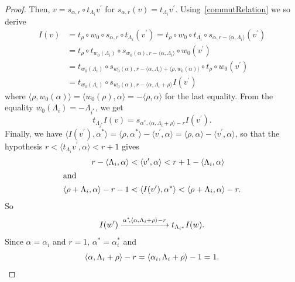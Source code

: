 \documentclass[ALCO,ThmDefs,Unicode,epreuves]{cedram}
\begin{document}
\begin{proof}
Then, $v=s_{\alpha,r}\circ t_{\Lambda_{i}}v^{\prime}$ for $s_{\alpha
,r}(v)=t_{\Lambda_{i}}v^{\prime}$. Using~\eqref{commutRelation} we so derive%
\begin{align*}
I(v)&=t_{\rho}\circ w_{0}\circ s_{\alpha,r}\circ t_{\Lambda_{i}}(v^{\prime
})=t_{\rho}\circ w_{0}\circ t_{\Lambda_{i}}\circ s_{\alpha,r-\langle
\alpha,\Lambda_{i}\rangle}(v^{\prime})\\
&=t_{\rho}\circ t_{w_{0}(\Lambda_{i})}\circ s_{w_{0}(\alpha),r-\langle
\alpha,\Lambda_{i}\rangle}\circ w_{0}(v^{\prime})\\
&=t_{w_{0}(\Lambda_{i})}\circ
s_{w_{0}(\alpha),r-\langle\alpha,\Lambda_{i}\rangle+\langle\rho,w_{0}%
(\alpha)\rangle}\circ t_{\rho}\circ w_{0}(v^{\prime})\\
&=t_{w_{0}(\Lambda_{i})}\circ s_{w_{0}(\alpha),r-\langle\alpha,\Lambda_{i}%
+\rho\rangle}I(v^{\prime})
\end{align*}
where $\langle\rho,w_{0}(\alpha)\rangle=\langle w_{0}(\rho),\alpha
\rangle=-\langle\rho,\alpha\rangle$ for the last equality. From the equality
$w_{0}(\Lambda_{i})=-\Lambda_{i^{\ast}}$, we get
\[
t_{\Lambda_{i^{\ast}}}I(v)=s_{\alpha^{\ast},\langle\alpha,\Lambda_{i}%
+\rho\rangle-r}I(v^{\prime}).
\]
Finally, we have $\langle I(v^{\prime}),\alpha^{\ast}\rangle=\langle
\rho,\alpha^{\ast}\rangle-\langle v^{\prime},\alpha\rangle=\langle\rho
,\alpha\rangle-\langle v^{\prime},\alpha\rangle$, so that the hypothesis
$r<\langle t_{\Lambda_{i}}v^{\prime},\alpha\rangle<r+1$ gives
\begin{align*}
r-\langle\Lambda_{i},\alpha\rangle & <\langle v^{\prime},\alpha
\rangle<r+1-\langle\Lambda_{i},\alpha\rangle \\
\intertext{and}%
\langle\rho+\Lambda_{i},\alpha\rangle-r-1 & <\langle I(v^{\prime}%
),\alpha^{\ast}\rangle<\langle\rho+\Lambda_{i},\alpha\rangle-r.
\end{align*}
So
\[
I(w^{\prime}%
)\xrightarrow{\alpha^{*}\mkern-4mu ,\langle \alpha,\Lambda_{i}+\rho\rangle-r}t_{\Lambda
_{i^{\ast}}}I(w).
\]
Since $\alpha=\alpha_{i}$ and $r=1$, $\alpha^{\ast}=\alpha_{i}^{\ast}$ and
\[
\langle\alpha,\Lambda_{i}+\rho\rangle-r=\langle\alpha_{i},\Lambda_{i}%
+\rho\rangle-1=1.\qedhere
\]
\end{proof}

\end{document}
